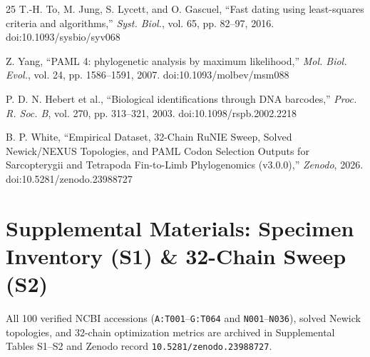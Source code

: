 \documentclass[10pt,letterpaper]{article}
\begin{document}
\begin{thebibliography}{25}
T.-H. To, M. Jung, S. Lycett, and O. Gascuel, ``Fast dating using least-squares criteria and algorithms,'' \emph{Syst. Biol.}, vol. 65, pp. 82--97, 2016. doi:10.1093/sysbio/syv068

Z. Yang, ``PAML 4: phylogenetic analysis by maximum likelihood,'' \emph{Mol. Biol. Evol.}, vol. 24, pp. 1586--1591, 2007. doi:10.1093/molbev/msm088

P. D. N. Hebert et al., ``Biological identifications through DNA barcodes,'' \emph{Proc. R. Soc. B}, vol. 270, pp. 313--321, 2003. doi:10.1098/rspb.2002.2218

B. P. White, ``Empirical Dataset, 32-Chain RuNIE Sweep, Solved Newick/NEXUS Topologies, and PAML Codon Selection Outputs for Sarcopterygii and Tetrapoda Fin-to-Limb Phylogenomics (v3.0.0),'' \emph{Zenodo}, 2026. doi:10.5281/zenodo.23988727

\end{thebibliography}

\section{Supplemental Materials: Specimen Inventory (S1) \& 32-Chain Sweep (S2)}
All 100 verified NCBI accessions (\texttt{A:T001}--\texttt{G:T064} and \texttt{N001}--\texttt{N036}), solved Newick topologies, and 32-chain optimization metrics are archived in Supplemental Tables S1--S2 and Zenodo record \texttt{10.5281/zenodo.23988727}.
\end{document}
